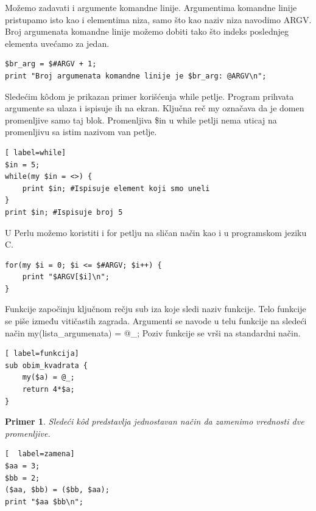 \documentclass[a4paper]{article}
\newtheorem{primer}{Primer}[section]
\begin{document}
Možemo zadavati i argumente komandne linije. Argumentima komandne linije pristupamo isto kao i elementima niza, samo što kao naziv niza navodimo ARGV. Broj argumenata komandne linije možemo dobiti tako što indeks poslednjeg elementa uvećamo za jedan.
\begin{lstlisting}[label=argv]
$br_arg = $#ARGV + 1;
print "Broj argumenata komandne linije je $br_arg: @ARGV\n";
\end{lstlisting}
Sledećim k\^{o}dom je prikazan primer korišćenja while petlje. Program prihvata argumente sa ulaza i ispisuje ih na ekran. Ključna reč my označava da je domen promenljive samo taj blok. Promenljiva \$in u while petlji nema uticaj na promenljivu sa istim nazivom van petlje.
\begin{lstlisting}[ label=while]
$in = 5;
while(my $in = <>) {
    print $in; #Ispisuje element koji smo uneli
}
print $in; #Ispisuje broj 5
\end{lstlisting}
U Perlu možemo koristiti i for petlju na sličan način kao i u programskom jeziku C.
\begin{lstlisting}[label=for]
for(my $i = 0; $i <= $#ARGV; $i++) {
    print "$ARGV[$i]\n";
}
\end{lstlisting}
Funkcije započinju ključnom rečju sub iza koje sledi naziv funkcije. Telo funkcije se piše između vitičastih zagrada. Argumenti se navode u telu funkcije na sledeći način my(lista\_argumenata) = @\_; Poziv funkcije se vr\v si na standardni na\v cin.
\begin{lstlisting}[ label=funkcija]
sub obim_kvadrata {
    my($a) = @_;
    return 4*$a;
}
\end{lstlisting}

\begin{primer}
Sledeći k\^{o}d predstavlja jednostavan način da zamenimo vrednosti dve promenljive.
\begin{lstlisting}[  label=zamena]
$aa = 3;
$bb = 2;
($aa, $bb) = ($bb, $aa);
print "$aa $bb\n";

\end{lstlisting}

\end{primer}
\end{document}
